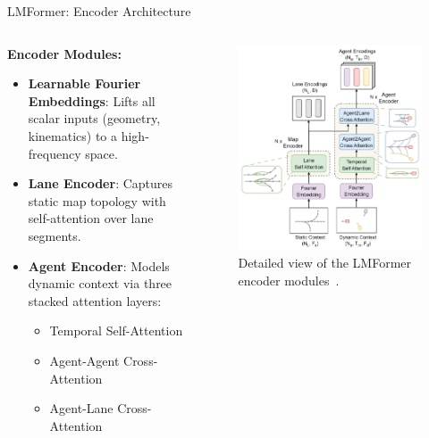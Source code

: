 \documentclass[10pt,aspectratio=169]{beamer}
\begin{document}
\begin{frame}{LMFormer: Encoder Architecture}
    \begin{columns}[T]
        \begin{column}{0.5\textwidth}
            \textbf{Encoder Modules:}
            \begin{itemize}
                \item \textbf{Learnable Fourier Embeddings}: Lifts all scalar inputs (geometry, kinematics) to a high-frequency space.
                \item \textbf{Lane Encoder}: Captures static map topology with self-attention over lane segments.
                \item \textbf{Agent Encoder}: Models dynamic context via three stacked attention layers:
                    \begin{itemize}
                        \item Temporal Self-Attention
                        \item Agent-Agent Cross-Attention
                        \item Agent-Lane Cross-Attention
                    \end{itemize}
            \end{itemize}
        \end{column}
        \begin{column}{0.5\textwidth}
            \begin{figure}
                \includegraphics[width=\textwidth, height=0.7\textheight, keepaspectratio]{docs/figures/lmformer_arch_encorder.png}
                \caption{Detailed view of the LMFormer encoder modules~\cite{lmformerYadav2025}.}
            \end{figure}
        \end{column}
    \end{columns}
\end{frame}
\end{document}
